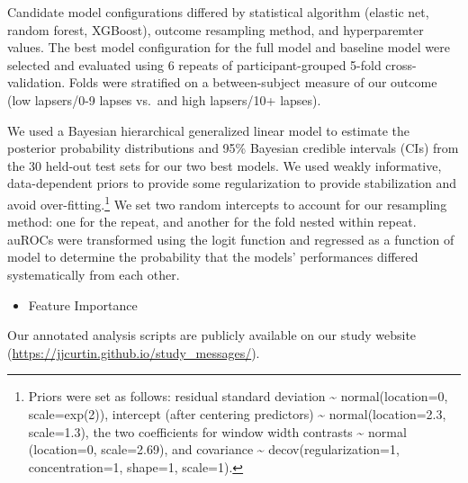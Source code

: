 \documentclass[
  letterpaper,
  DIV=11,
  numbers=noendperiod]{scrartcl}
\providecommand{\tightlist}{%
  \setlength{\itemsep}{0pt}\setlength{\parskip}{0pt}}\usepackage{longtable,booktabs,array}
\begin{document}
Candidate model configurations differed by statistical algorithm
(elastic net, random forest, XGBoost), outcome resampling method, and
hyperparemter values. The best model configuration for the full model
and baseline model were selected and evaluated using 6 repeats of
participant-grouped 5-fold cross-validation. Folds were stratified on a
between-subject measure of our outcome (low lapsers/0-9 lapses vs.~and
high lapsers/10+ lapses).

We used a Bayesian hierarchical generalized linear model to estimate the
posterior probability distributions and 95\% Bayesian credible intervals
(CIs) from the 30 held-out test sets for our two best models. We used
weakly informative, data-dependent priors to provide some regularization
to provide stabilization and avoid over-fitting.\footnote{Priors were
  set as follows: residual standard deviation \textasciitilde{}
  normal(location=0, scale=exp(2)), intercept (after centering
  predictors) \textasciitilde{} normal(location=2.3, scale=1.3), the two
  coefficients for window width contrasts \textasciitilde{} normal
  (location=0, scale=2.69), and covariance \textasciitilde{}
  decov(regularization=1, concentration=1, shape=1, scale=1).} We set
two random intercepts to account for our resampling method: one for the
repeat, and another for the fold nested within repeat. auROCs were
transformed using the logit function and regressed as a function of
model to determine the probability that the models' performances
differed systematically from each other.

\begin{itemize}
\tightlist
\item
  Feature Importance
\end{itemize}

Our annotated analysis scripts are publicly available on our study
website (\url{https://jjcurtin.github.io/study_messages/}).
\end{document}
